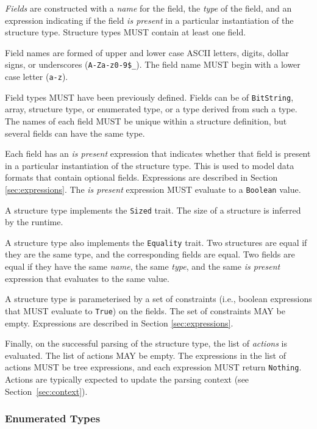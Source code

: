 \documentclass[10pt,twocolumn,a4paper]{article}
\newcommand{\code}[1]{\texttt{#1}}
\begin{document}
\emph{Fields} are constructed with a \emph{name} for the field, the
\emph{type} of the field, and an expression indicating if the field
\emph{is present} in a particular instantiation of the structure type.
Structure types MUST contain at least one field.

Field names are formed of upper and lower case ASCII letters,
digits, dollar signs, or underscores (\code{A-Za-z0-9\$\_}). The field name
MUST begin with a lower case letter (\code{a-z}).

Field types MUST have been previously defined.
Fields can be of \code{BitString}, array, structure type, or enumerated type,
or a type derived from such a type. The names of each field MUST be unique
within a structure definition, but several fields can have the same type.

Each field has an \emph{is present} expression that indicates
whether that field is present in a particular instantiation of the
structure type. This is used to model data formats that contain optional
fields. Expressions are described in Section \ref{sec:expressions}. The
\emph{is present} expression MUST evaluate to a \code{Boolean} value.

A structure type implements the \code{Sized} trait. The size of a structure is
inferred by the runtime.

A structure type also implements the \code{Equality} trait. Two structures
are equal if they are the same type, and the
corresponding fields are equal. Two fields are equal if they have the same
\emph{name}, the same \emph{type}, and the same \emph{is present} expression
that evaluates to the same value.

A structure type is parameterised by a set of constraints (i.e., boolean
expressions that MUST evaluate to \code{True}) on the
fields. The set of constraints MAY be empty. Expressions are described in
Section \ref{sec:expressions}.

Finally, on the successful parsing of the structure type, the list of \emph{actions} is
evaluated. The list of actions MAY be empty.  The expressions in the list of actions MUST
be tree expressions, and each expression MUST return \code{Nothing}. Actions are typically
expected to update the parsing context (see Section~\ref{sec:context}).

\subsubsection{Enumerated Types}
\label{sec:enum-type}
\end{document}
